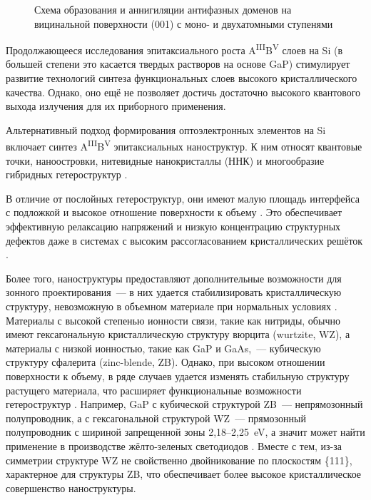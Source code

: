 \begin{figure}[ht]  \caption{Схема образования и аннигиляции антифазных доменов на вицинальной
поверхности (001) с моно- и двухатомными ступенями}\label{fig:Image_2}
\end{figure}

Продолжающееся исследования эпитаксиального роста
A\textsuperscript{III}B\textsuperscript{V} слоев на Si (в большей степени это
касается твердых растворов на основе GaP) стимулирует развитие технологий
синтеза функциональных слоев высокого кристаллического качества. Однако, оно
ещё не позволяет достичь достаточно высокого квантового выхода излучения для их
приборного применения.

Альтернативный подход формирования оптоэлектронных элементов на Si включает
синтез A\textsuperscript{III}B\textsuperscript{V} эпитаксиальных наноструктур.
К ним относят квантовые точки, наноостровки, нитевидные нанокристаллы (ННК) и
многообразие гибридных гетероструктур \cite{Tan2018}.

В отличие от послойных гетероструктур, они имеют малую площадь интерфейса с
подложкой и высокое отношение поверхности к объему \cite{Bolshakov2013,
Tchernycheva2007}. Это обеспечивает эффективную релаксацию напряжений и низкую
концентрацию структурных дефектов даже в системах с высоким рассогласованием
кристаллических решёток \cite{Samsonenko2011}.

Более того, наноструктуры предоставляют дополнительные возможности для зонного
проектирования~--- в них удается стабилизировать кристаллическую структуру,
невозможную в объемном материале при нормальных условиях \cite{Mohseni2009}.
Материалы с высокой степенью ионности связи, такие как нитриды, обычно имеют
гексагональную кристаллическую структуру вюрцита (wurtzite, WZ), а материалы с
низкой ионностью, такие как GaP и GaAs,~--- кубическую структуру сфалерита
(zinc-blende, ZB). Однако, при высоком отношении поверхности к объему, в ряде
случаев удается изменять стабильную структуру растущего материала, что
расширяет функциональные возможности гетероструктур \cite{Spirkoska2009}.
Например, GaP с кубической структурой ZB~--- непрямозонный полупроводник, а с
гексагональной структурой WZ~--- прямозонный полупроводник с шириной
запрещенной зоны 2,18--2,25~\si{\electronvolt}, а значит может найти применение
в производстве жёлто-зеленых светодиодов \cite{Assali2013}. Вместе с тем, из-за
симметрии структуре WZ не свойственно двойникование по плоскостям \{111\},
характерное для структуры ZB, что обеспечивает более высокое кристаллическое
совершенство наноструктуры.

